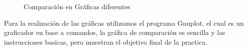 \documentclass[12pt,a4paper,openright]{article}
\begin{document}
\begin{figure}[htb]
\centering
{} \hspace{10mm}
\caption{Comparación en Gráficas diferentes} 
\end{figure} 


Para la realización de las gráficas utilizamos el programa Gnuplot, el cual es un graficador en base a comandos, la gráfica de comparación es sencilla y las instrucciones basicas, pero muestran el objetivo final de la practica.
\end{document}
